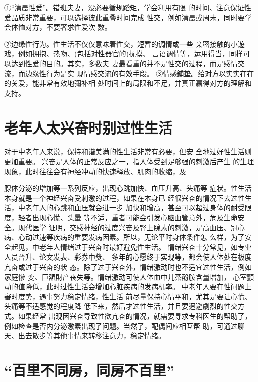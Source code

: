\documentclass[12pt,UTF8]{ctexbook}
\begin{document}
①“清晨性爱”。错班夫妻，没必要循规蹈矩，学会利用有限
的时间、注意保证性爱品质非常重要，可以选择彼此重叠时间完成
性交，例如清晨或周末，同时要学会体恤对方，不要奢求性爱次
数。

②边缘性行为。性生活不仅仅意味着性交，短暂的调情或一些
亲密接触的小遊戏，例如拥抱、热吻、(包括对性器官的)抚摸、
言语调情等，运用得当，同样可以达到性爱的目的。其实，多数夫
妻最看重的并不是性交的过程，而是感情交流，而边缘性行为是实
现情感交流的有效手段。
③情感鋪垫。给对方以实实在在的关爱，能非常有效地彌补相
处时间上的局限和不足，并真正赢得对方的理解和支持。


\section{老年人太兴奋时别过性生活}

对于中老年人来说，保持和谐美满的性生活非常有必要，但安
全地过好性生活则更加重要。
兴奋是人体的正常反应之一，指人体受到足够强的刺激后产生
的生理现象，此时往往会有神经冲动的快速释放、肌肉的收缩，及

腺体分泌的增加等一系列反应，出现心跳加快、血压升高、头痛等
症状。性生活本身就是一个神经兴奋受刺激的过程，如果在本身已
经很兴奋的情况下去过性生活，中老年人的心跳和血压就会进一步
加快和增高，甚至可以超过身体的耐受限度，轻者出现心慌、头暈
等不适，重者可能会引发心脑血管意外，危及生命安全。现代医学
证明，交感神经的过度兴奋及腎上腺素的刺激，是高血压、冠心
病、心动过速等疾病的重要发病因素。所以，无论平时身体条件怎
么样，为了安全起见，中老年人情绪过于兴奋时最好避免性生活。
情绪兴奋十分常见，如专业人员晉升、论文发表、彩券中獎、
多年的心愿终于实现等，都会使人体处在极度亢奋或过于兴奋的状
态。除了过于兴奋外，情绪激动时也不适宜过性生活，例如家庭慘
变、巨額財产丧失等。情绪激动可使人体血中儿茶酚胺含量增加，
心室颤动的值降低，此时过性生活会增加心脏疾病的发病机率。
中老年人要在性问题上審时度势，遇事努力稳定情绪，性生活
前尽量保持心情平和，尤其是要让心慌、头痛等不适感觉的程度降
低下来，然后才过性生活，并且要迥避劇烈的性交方式。如果经常
出现因兴奋导致性欲亢奋的情况，就需要寻求专科医生的帮助了，
例如检查是否内分泌激素出现了问题。当然了，配偶间应相互帮
助，可通过聊天、出去散步等其他事情来转移注意力，稳定情绪。

\section{“百里不同房，同房不百里”}
\end{document}
